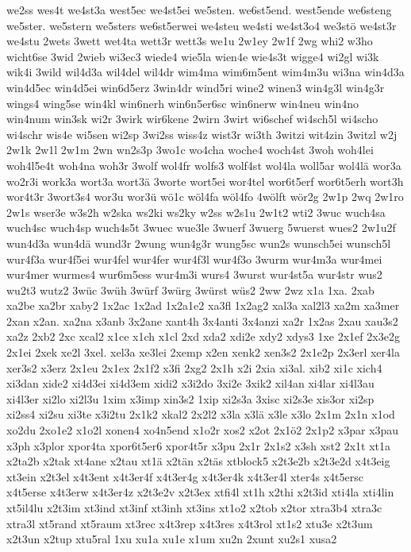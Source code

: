 {we2ss
wes4t
we4st3a
west5ec
we4st5ei
we5sten.
we6st5end.
west5ende
we6steng
we5ster.
we5stern
we5sters
we6st5erwei
we4steu
we4sti
we4st3o4
we3stö
we4st3r
we4stu
2wets
3wett
wet4ta
wett3r
wett3s
we1u
2w1ey
2w1f
2wg
whi2
w3ho
wicht6se
3wid
2wieb
wi3ec3
wiede4
wie5la
wien4e
wie4s3t
wigge4
wi2gl
wi3k
wik4i
3wild
wil4d3a
wil4del
wil4dr
wim4ma
wim6m5ent
wim4m3u
wi3na
win4d3a
win4d5ec
win4d5ei
win6d5erz
3win4dr
wind5ri
wine2
winen3
win4g3l
win4g3r
wings4
wing5se
win4kl
win6nerh
win6n5er6sc
win6nerw
win4neu
win4no
win4num
win3sk
wi2r
3wirk
wir6kene
2wirn
3wirt
wi6schef
wi4sch5l
wi4scho
wi4schr
wis4e
wi5sen
wi2sp
3wi2ss
wiss4z
wist3r
wi3th
3witzi
wit4zin
3witzl
w2j
2w1k
2w1l
2w1m
2wn
wn2s3p
3wo1c
wo4cha
woche4
woch4st
3woh
woh4lei
woh4l5e4t
woh4na
woh3r
3wolf
wol4fr
wolfs3
wolf4st
wol4la
woll5ar
wol4lä
wor3a
wo2r3i
work3a
wort3a
wort3ä
3worte
wort5ei
wor4tel
wor6t5erf
wor6t5erh
wort3h
wor4t3r
3wort3s4
wor3u
wor3ü
wö1c
wöl4fa
wöl4fo
4wölft
wör2g
2w1p
2wq
2w1ro
2w1s
wser3e
w3s2h
w2ska
ws2ki
ws2ky
w2ss
w2s1u
2w1t2
wti2
3wuc
wuch4sa
wuch4sc
wuch4sp
wuch4s5t
3wuec
wue3le
3wuerf
3wuerg
5wuerst
wues2
2w1u2f
wun4d3a
wun4dä
wund3r
2wung
wun4g3r
wung5sc
wun2s
wunsch5ei
wunsch5l
wur4f3a
wur4f5ei
wur4fel
wur4fer
wur4f3l
wur4f3o
3wurm
wur4m3a
wur4mei
wur4mer
wurmes4
wur6m5ess
wur4m3i
wurs4
3wurst
wur4st5a
wur4str
wus2
wu2t3
wutz2
3wüc
3wüh
3würf
3würg
3würst
wüs2
2ww
2wz
x1a
1xa.
2xab
xa2be
xa2br
xaby2
1x2ac
1x2ad
1x2a1e2
xa3fl
1x2ag2
xal3a
xal2l3
xa2m
xa3mer
2xan
x2an.
xa2na
x3anb
3x2ane
xant4h
3x4anti
3x4anzi
xa2r
1x2as
2xau
xau3s2
xa2z
2xb2
2xc
xcal2
x1ce
x1ch
x1cl
2xd
xda2
xdi2e
xdy2
xdys3
1xe
2x1ef
2x3e2g
2x1ei
2xek
xe2l
3xel.
xel3a
xe3lei
2xemp
x2en
xenk2
xen3s2
2x1e2p
2x3erl
xer4la
xer3s2
x3erz
2x1eu
2x1ex
2x1f2
x3fi
2xg2
2x1h
x2i
2xia
xi3al.
xib2
xi1c
xich4
xi3dan
xide2
xi4d3ei
xi4d3em
xidi2
x3i2do
3xi2e
3xik2
xil4an
xi4lar
xi4l3au
xi4l3er
xi2lo
xi2l3u
1xim
x3imp
xin3s2
1xip
xi2s3a
3xisc
xi2s3e
xis3or
xi2sp
xi2ss4
xi2su
xi3te
x3i2tu
2x1k2
xkal2
2x2l2
x3la
x3lä
x3le
x3lo
2x1m
2x1n
x1od
xo2du
2xo1e2
x1o2l
xonen4
xo4n5end
x1o2r
xos2
x2ot
2x1ö2
2x1p2
x3par
x3pau
x3ph
x3plor
xpor4ta
xpor6t5er6
xpor4t5r
x3pu
2x1r
2x1s2
x3sh
xst2
2x1t
xt1a
x2ta2b
x2tak
xt4ane
x2tau
xt1ä
x2tän
x2täs
xtblock5
x2t3e2b
x2t3e2d
x4t3eig
xt3ein
x2t3el
x4t3ent
x4t3er4f
x4t3er4g
x4t3er4k
x4t3er4l
xter4s
x4t5ersc
x4t5erse
x4t3erw
x4t3er4z
x2t3e2v
x2t3ex
xtfi4l
xt1h
x2thi
x2t3id
xti4la
xti4lin
xt5il4lu
x2t3im
xt3ind
xt3inf
xt3inh
xt3ins
xt1o2
x2tob
x2tor
xtra3b4
xtra3c
xtra3l
xt5rand
xt5raum
xt3rec
x4t3rep
x4t3res
x4t3rol
xt1s2
xtu3e
x2t3um
x2t3un
x2tup
xtu5ral
1xu
xu1a
xu1e
x1um
xu2n
2xunt
xu2s1
xusa2
}
